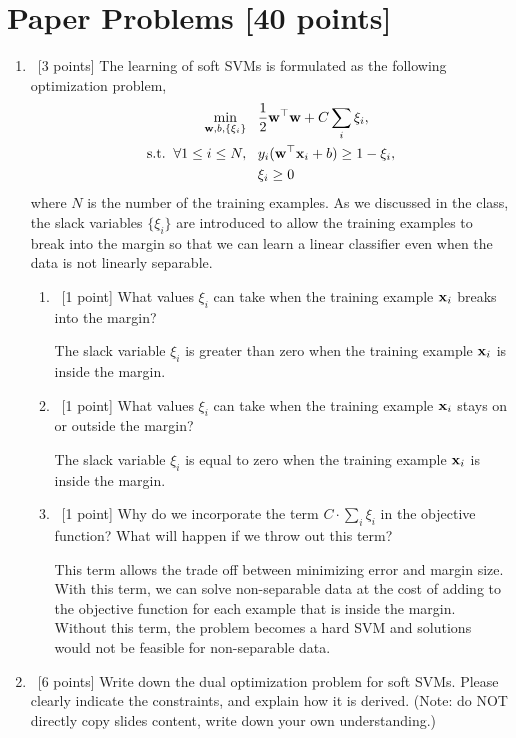 \documentclass[12pt, fullpage,letterpaper]{article}
\begin{document}
\section{Paper Problems [40 points]}
\begin{enumerate}
	\item~[3 points] The learning of soft SVMs is formulated as the following optimization problem,
		\begin{align}
		\min\limits_{{\bf w}, b, \{\xi_i\}} &\;\;\;\frac{1}{2}{\bf w}^\top{\bf w} + C\sum_i \xi_i, \nonumber\\
		\mathrm{s.t.}\;\; \forall 1 \le i \le N,&\;\;\; y_i({\bf w}^\top {\bf x}_i + b) \ge 1 - \xi_i , \nonumber \\
		&\;\;\; \xi_i \ge 0 \nonumber
		\end{align}
		where $N$ is the number of the training examples.
	As we discussed in the class, the slack variables $\{\xi_i\}$ are introduced to allow the training examples to break into the margin so that we can learn a linear classifier even when the data is not linearly separable. 
	\begin{enumerate}
		\item~[1 point] What values $\xi_i$ can take when the training example ${\bf x}_i$ breaks into the margin? 
		
		
		
		
		The slack variable $\xi_i$ is greater than zero when the training example ${\bf x}_i$ is inside the margin.
		
		
		\item~[1 point] What values $\xi_i$ can take when the training example ${\bf x}_i$ stays on or outside the margin? 
		
		
		The slack variable $\xi_i$ is equal to zero when the training example ${\bf x}_i$ is inside the margin.
		
		
		\item~[1 point] Why do we incorporate the term $C\cdot\sum_i \xi_i $ in the objective function? What will happen if we throw out this term?

		This term allows the trade off between minimizing error and margin size. With this term, we can solve non-separable data at the cost of adding to the objective function for each example that is inside the margin. Without this term, the problem becomes a hard SVM and solutions would not be feasible for non-separable data. 
		
	\end{enumerate}
	
	
	\item~[6 points] Write down the dual optimization problem for soft SVMs.  
	Please clearly indicate the constraints, and explain how it is derived. (Note: do NOT directly copy slides content, write down your own understanding.)
	

\end{enumerate}
\end{document}
